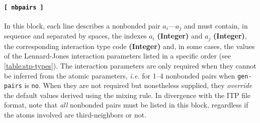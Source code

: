 \documentclass[10pt,a4paper]{report}
\numberwithin{equation}{section}
\begin{document}
\paragraph{\texttt{[~nbpairs~]}}



In this block, each line describes a nonbonded pair $a_i$---$a_j$ and
must contain, in sequence and separated by spaces, the indexes $a_i$
\textbf{(Integer)} and $a_j$ \textbf{(Integer)}, the corresponding
interaction type code \textbf{(Integer)} and, in some cases, the
values of the Lennard-Jones interaction parameters listed in a
specific order (see \autoref{table:stp-types}).  The interaction
parameters are only required when they cannot be inferred from the
atomic parameters, \textit{i.e.} for 1--4 nonbonded pairs when
\texttt{gen-pairs} is \texttt{no}. When they are not required but
nonetheless supplied, they \textit{override} the default values
derived using the mixing rule.  In divergence with the ITP file
format, note that \textit{all} nonbonded pairs must be listed in this
block, regardless if the atoms involved are third-neighbors or not.
\end{document}
